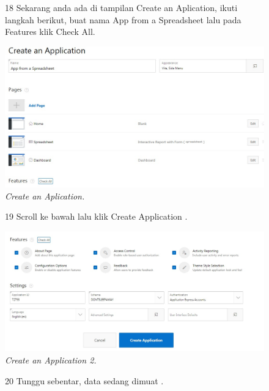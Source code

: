 \begin{enumerate}
\begin{figure}
\item[18] Sekarang anda ada di tampilan Create an Aplication, ikuti langkah berikut, buat nama App from a Spreadsheet lalu pada Features klik Check All.

    \begin{center}
\includegraphics[scale=0.4]{figures/create1.jpg}
    \caption{\textit{Create an Aplication.}}
        \end{center}
\label{gambar}
\end{figure}


\begin{figure}
\item[19]Scroll ke bawah lalu klik Create Application .

    \begin{center}
\includegraphics[scale=0.4]{figures/create2.jpg}
    \caption{\textit{Create an Application 2.}}
        \end{center}
\label{gambar}
\end{figure}

\begin{figure}
\item[20]Tunggu sebentar, data sedang dimuat .


\end{figure}
\end{enumerate}
